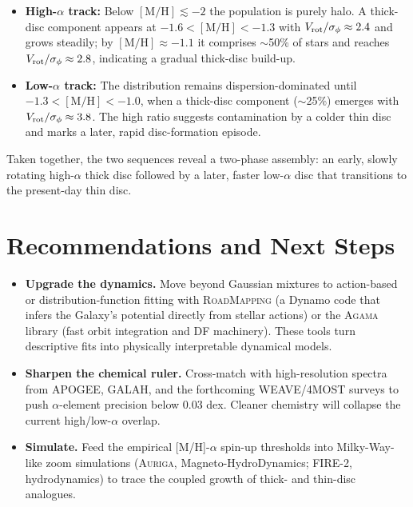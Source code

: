 \documentclass[a4paper,10pt]{article}
\begin{document}
\begin{multicols}{2}
\begin{itemize}
  \item \textbf{High-$\alpha$ track:} Below $\mathrm{[M/H]}\lesssim -2$ the population is purely halo.  
        A thick-disc component appears at $-1.6 < [\mathrm{M/H}] < -1.3$ with 
        $V_{\rm rot}/\sigma_\phi \approx 2.4$ and grows steadily; by 
        $[\mathrm{M/H}]\approx -1.1$ it comprises $\sim$50\% of stars and 
        reaches $V_{\rm rot}/\sigma_\phi \approx 2.8$, indicating a gradual 
        thick-disc build-up.
  \item \textbf{Low-$\alpha$ track:} The distribution remains dispersion-dominated 
        until $-1.3 < [\mathrm{M/H}] < -1.0$, when a thick-disc component 
        ($\sim$25\%) emerges with $V_{\rm rot}/\sigma_\phi \approx 3.8$.  
        The high ratio suggests contamination by a colder thin disc and marks a 
        later, rapid disc-formation episode.
\end{itemize}

Taken together, the two sequences reveal a two-phase assembly: an early, 
slowly rotating high-$\alpha$ thick disc followed by a later, faster low-$\alpha$ 
disc that transitions to the present-day thin disc.


\section*{Recommendations and Next Steps}

\begin{itemize}
  \item \textbf{Upgrade the dynamics.}  Move beyond Gaussian mixtures to
        action-based or distribution-function fitting with
        \textsc{RoadMapping} (a Dynamo code that infers the Galaxy's potential
        directly from stellar actions) or the \textsc{Agama} library
        (fast orbit integration and DF machinery).  These tools turn descriptive fits into
        physically interpretable dynamical models.

  \item \textbf{Sharpen the chemical ruler.}  Cross-match with high-resolution
        spectra from APOGEE, GALAH, and the forthcoming WEAVE/4MOST surveys to
        push $\alpha$-element precision below 0.03 dex.  Cleaner chemistry will
        collapse the current high/low-$\alpha$ overlap.


  \item \textbf{Simulate.}  
        Feed the empirical [M/H]-$\alpha$ spin-up thresholds into Milky-Way-like zoom simulations
        (\textsc{Auriga}, Magneto-HydroDynamics; \textsc{FIRE-2}, hydrodynamics) to trace the coupled growth of thick- and thin-disc analogues.


\end{itemize}
\end{multicols}
\end{document}
